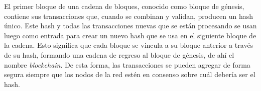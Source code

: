El primer bloque de una cadena de bloques, conocido como bloque de génesis, contiene sus transacciones que, cuando se combinan y validan, producen un hash único. Este hash y todas las transacciones nuevas que se están procesando se usan luego como entrada para crear un nuevo hash que se usa en el siguiente bloque de la cadena. Esto significa que cada bloque se vincula a su bloque anterior a través de su hash, formando una cadena de regreso al bloque de génesis, de ahí el nombre \textit{blockchain}. De esta forma, las transacciones se pueden agregar de forma segura siempre que los nodos de la red estén en consenso sobre cuál debería ser el hash.


